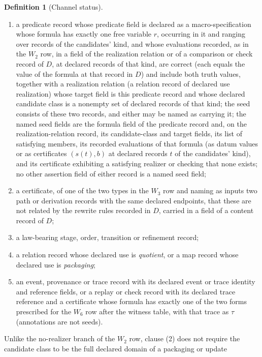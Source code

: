 \documentclass[11pt]{article}
\theoremstyle{definition}
\newtheorem{definition}[theorem]{Definition}
\begin{document}
\begin{definition}[Channel status]
\begin{enumerate}[label=(\arabic*),topsep=2pt,itemsep=1pt]
references as its source relation, or with the relation record
serving as source relation in a cluster satisfying \(W_1\) that contains it;
  \item a predicate record
whose predicate field is declared as a macro-specification whose formula has
exactly one free variable \(r\), occurring in it and ranging over records of
the candidates' kind, and whose evaluations recorded, as in the \(W_2\) row, in a field of the realization relation or of a comparison or check record of \(D\), at declared records of
that kind, are correct (each equals the value of the formula at that record in
\(D\)) and include both truth values, together with a
realization relation (a relation record of declared use realization) whose target field is this predicate record and whose declared candidate class is a nonempty set of declared records of that kind; the seed consists of these two records, and either may be named as carrying it; the named seed fields are the formula field of the predicate record and, on
the realization-relation record, its candidate-class and target fields, its
list of satisfying members, its recorded evaluations of that formula (as datum
values or as certificates \((s(t),b)\) at declared records \(t\) of the
candidates' kind), and its certificate exhibiting a satisfying realizer or
checking that none exists; no other assertion field of either record is a named
seed field;
  \item a certificate, of one of the two types in the \(W_3\) row and naming as inputs two path or derivation records with the same declared endpoints, that these are not related by the rewrite rules recorded in \(D\), carried in a field of a content record of \(D\);
  \item a
law-bearing stage, order, transition or refinement record;
  \item a relation record whose
declared use is \emph{quotient}, or a map record whose declared use is \emph{packaging};
  \item an event, provenance or trace record with its declared event or trace
identity and reference fields, or a replay or check record with its declared
trace reference and a certificate whose formula has exactly one of the two forms prescribed for the \(W_6\) row after the witness table, with that trace as \(\tau\) (annotations are not
seeds).
\end{enumerate}
Unlike the no-realizer branch of the \(W_2\) row, clause (2) does not require
the candidate class to be the full declared domain of a packaging or update

\end{definition}
\end{document}
